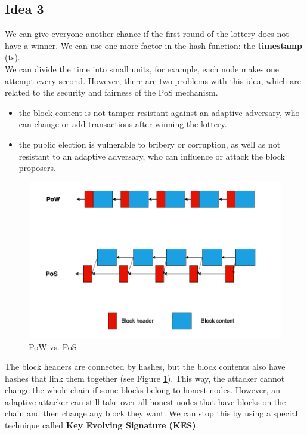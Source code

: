 \subsection{Idea 3}
We can give everyone another chance if the first round of the lottery does not have a winner. We can use one more factor in the hash function: the \textbf{timestamp} (ts).\\
We can divide the time into small units, for example, each node makes one attempt every second.
However, there are two problems with this idea, which are related to the security and fairness of the PoS mechanism.
\begin{itemize}
    \item the block content is not tamper-resistant against an adaptive adversary, who can change or add transactions after winning the lottery.
    \item the public election is vulnerable to bribery or corruption, as well as not resistant to an adaptive adversary, who can influence or attack the block proposers.
\end{itemize}
\begin{figure}[h!]
    \centering
    \includegraphics[width=0.7\linewidth]{Fig/11/F1}
    \caption{PoW vs. PoS}
    \label{fig:f1}
\end{figure}
The block headers are connected by hashes, but the block contents also have hashes that link them together (see Figure \ref{fig:f1}). This way, the attacker cannot change the whole chain if some blocks belong to honest nodes. However, an adaptive attacker can still take over all honest nodes that have blocks on the chain and then change any block they want. We can stop this by using a special technique called \textbf{Key Evolving Signature (KES)}.

